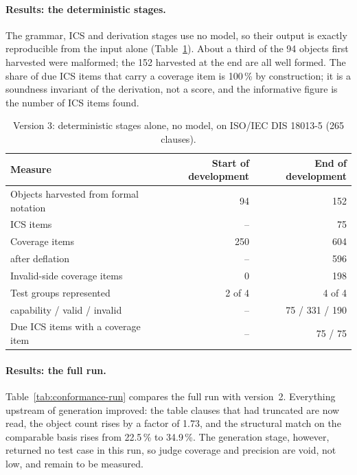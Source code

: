 \paragraph{Results: the deterministic stages.}
The grammar, ICS and derivation stages use no model, so their output is
exactly reproducible from the input alone (Table~\ref{tab:deterministic}).
About a third of the 94 objects first harvested were malformed; the 152
harvested at the end are all well formed. The
share of due ICS items that carry a coverage item is 100\,\% by construction;
it is a soundness invariant of the derivation, not a score, and the
informative figure is the number of ICS items found.

\begin{table}[t]
  \centering
  \caption{Version 3: deterministic stages alone, no model, on ISO/IEC DIS
    18013-5 (265 clauses).}
  \label{tab:deterministic}
  \small\setlength{\tabcolsep}{4pt}
  \begin{tabular}{lrr}
    \toprule
    Measure & Start of development & End of development \\
    \midrule
    Objects harvested from formal notation & 94 & 152 \\
    ICS items                              & --   & 75 \\
    Coverage items                         & 250  & 604 \\
    \quad after deflation                  & --   & 596 \\
    Invalid-side coverage items            & 0    & 198 \\
    Test groups represented                & 2 of 4 & 4 of 4 \\
    \quad capability / valid / invalid     & --   & 75 / 331 / 190 \\
    Due ICS items with a coverage item     & --   & 75 / 75 \\
    \bottomrule
  \end{tabular}
\end{table}

\paragraph{Results: the full run.}
Table~\ref{tab:conformance-run} compares the full run with version~2.
Everything upstream of generation improved: the table clauses that had
truncated are now read, the object count rises by a factor of 1.73, and the
structural match on the comparable basis rises from 22.5\,\% to 34.9\,\%. The
generation stage, however, returned no test case in this run, so judge
coverage and precision are void, not low, and remain to be measured.

